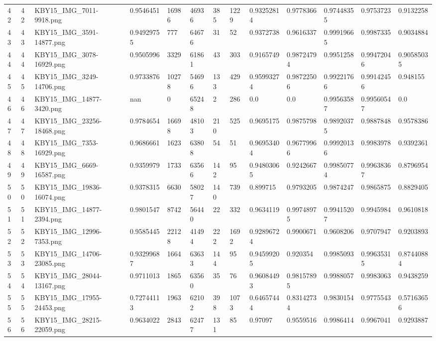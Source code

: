 \documentclass[11pt, a4paper, twoside]{report}
\begin{document}
\begin{longtable}[c]{@{}lllllllllllll@{}}
42 & 42 & KBY15\_IMG\_7011-9918.png & 0.9546451 & 16986 & 46936 & 385 & 1229 & 0.93252814 & 0.9778366 & 0.97448355 & 0.9753723 & 0.9132258 \\
43 & 43 & KBY15\_IMG\_3591-14877.png & 0.94929755 & 777 & 64676 & 31 & 52 & 0.9372738 & 0.9616337 & 0.99919665 & 0.9987335 & 0.9034884 \\
44 & 44 & KBY15\_IMG\_3078-16929.png & 0.9505996 & 3329 & 61861 & 43 & 303 & 0.9165749 & 0.98724794 & 0.9951258 & 0.99472046 & 0.90585035 \\
45 & 45 & KBY15\_IMG\_3249-14706.png & 0.9733876 & 10278 & 54696 & 133 & 429 & 0.95993274 & 0.98722506 & 0.99221766 & 0.99142456 & 0.948155 \\
46 & 46 & KBY15\_IMG\_14877-3420.png & nan & 0 & 65248 & 2 & 286 & 0.0 & 0.0 & 0.99563587 & 0.99560547 & 0.0 \\
47 & 47 & KBY15\_IMG\_23256-18468.png & 0.9784654 & 16698 & 48103 & 210 & 525 & 0.9695175 & 0.9875798 & 0.98920375 & 0.9887848 & 0.9578386 \\
48 & 48 & KBY15\_IMG\_7353-16929.png & 0.9686661 & 1623 & 63808 & 54 & 51 & 0.96953404 & 0.96779966 & 0.99920136 & 0.9983978 & 0.9392361 \\
49 & 49 & KBY15\_IMG\_6669-16587.png & 0.9359979 & 1733 & 63566 & 142 & 95 & 0.94803065 & 0.9242667 & 0.99850774 & 0.99638367 & 0.8796954 \\
50 & 50 & KBY15\_IMG\_19836-16074.png & 0.9378315 & 6630 & 58027 & 140 & 739 & 0.899715 & 0.9793205 & 0.9874247 & 0.9865875 & 0.8829405 \\
51 & 51 & KBY15\_IMG\_14877-2394.png & 0.9801547 & 8742 & 56440 & 22 & 332 & 0.9634119 & 0.99748975 & 0.99415207 & 0.9945984 & 0.9610818 \\
52 & 52 & KBY15\_IMG\_12996-7353.png & 0.9585445 & 22128 & 41494 & 222 & 1692 & 0.92896724 & 0.9900671 & 0.9608206 & 0.9707947 & 0.9203893 \\
53 & 53 & KBY15\_IMG\_14706-23085.png & 0.93299687 & 1664 & 63633 & 144 & 95 & 0.94599205 & 0.920354 & 0.9985093 & 0.99635315 & 0.87440884 \\
54 & 54 & KBY15\_IMG\_28044-13167.png & 0.9711013 & 1865 & 63560 & 35 & 76 & 0.96084493 & 0.98157895 & 0.9988057 & 0.9983063 & 0.9438259 \\
55 & 55 & KBY15\_IMG\_17955-24453.png & 0.72744113 & 1963 & 62102 & 398 & 1073 & 0.64657444 & 0.83142734 & 0.9830154 & 0.9775543 & 0.57163656 \\
56 & 56 & KBY15\_IMG\_28215-22059.png & 0.9634022 & 2843 & 62477 & 131 & 85 & 0.97097 & 0.9559516 & 0.9986414 & 0.9967041 & 0.9293887 \\

\end{longtable}
\end{document}
